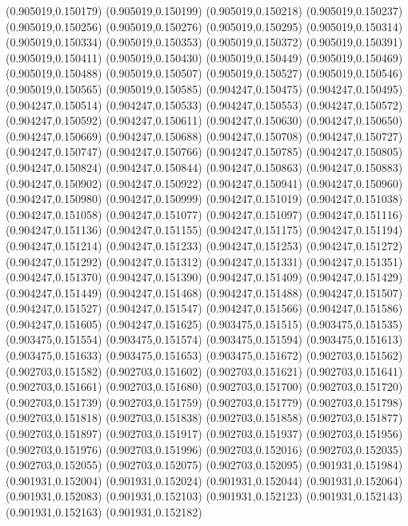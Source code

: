 (0.905019,0.150179)
(0.905019,0.150199)
(0.905019,0.150218)
(0.905019,0.150237)
(0.905019,0.150256)
(0.905019,0.150276)
(0.905019,0.150295)
(0.905019,0.150314)
(0.905019,0.150334)
(0.905019,0.150353)
(0.905019,0.150372)
(0.905019,0.150391)
(0.905019,0.150411)
(0.905019,0.150430)
(0.905019,0.150449)
(0.905019,0.150469)
(0.905019,0.150488)
(0.905019,0.150507)
(0.905019,0.150527)
(0.905019,0.150546)
(0.905019,0.150565)
(0.905019,0.150585)
(0.904247,0.150475)
(0.904247,0.150495)
(0.904247,0.150514)
(0.904247,0.150533)
(0.904247,0.150553)
(0.904247,0.150572)
(0.904247,0.150592)
(0.904247,0.150611)
(0.904247,0.150630)
(0.904247,0.150650)
(0.904247,0.150669)
(0.904247,0.150688)
(0.904247,0.150708)
(0.904247,0.150727)
(0.904247,0.150747)
(0.904247,0.150766)
(0.904247,0.150785)
(0.904247,0.150805)
(0.904247,0.150824)
(0.904247,0.150844)
(0.904247,0.150863)
(0.904247,0.150883)
(0.904247,0.150902)
(0.904247,0.150922)
(0.904247,0.150941)
(0.904247,0.150960)
(0.904247,0.150980)
(0.904247,0.150999)
(0.904247,0.151019)
(0.904247,0.151038)
(0.904247,0.151058)
(0.904247,0.151077)
(0.904247,0.151097)
(0.904247,0.151116)
(0.904247,0.151136)
(0.904247,0.151155)
(0.904247,0.151175)
(0.904247,0.151194)
(0.904247,0.151214)
(0.904247,0.151233)
(0.904247,0.151253)
(0.904247,0.151272)
(0.904247,0.151292)
(0.904247,0.151312)
(0.904247,0.151331)
(0.904247,0.151351)
(0.904247,0.151370)
(0.904247,0.151390)
(0.904247,0.151409)
(0.904247,0.151429)
(0.904247,0.151449)
(0.904247,0.151468)
(0.904247,0.151488)
(0.904247,0.151507)
(0.904247,0.151527)
(0.904247,0.151547)
(0.904247,0.151566)
(0.904247,0.151586)
(0.904247,0.151605)
(0.904247,0.151625)
(0.903475,0.151515)
(0.903475,0.151535)
(0.903475,0.151554)
(0.903475,0.151574)
(0.903475,0.151594)
(0.903475,0.151613)
(0.903475,0.151633)
(0.903475,0.151653)
(0.903475,0.151672)
(0.902703,0.151562)
(0.902703,0.151582)
(0.902703,0.151602)
(0.902703,0.151621)
(0.902703,0.151641)
(0.902703,0.151661)
(0.902703,0.151680)
(0.902703,0.151700)
(0.902703,0.151720)
(0.902703,0.151739)
(0.902703,0.151759)
(0.902703,0.151779)
(0.902703,0.151798)
(0.902703,0.151818)
(0.902703,0.151838)
(0.902703,0.151858)
(0.902703,0.151877)
(0.902703,0.151897)
(0.902703,0.151917)
(0.902703,0.151937)
(0.902703,0.151956)
(0.902703,0.151976)
(0.902703,0.151996)
(0.902703,0.152016)
(0.902703,0.152035)
(0.902703,0.152055)
(0.902703,0.152075)
(0.902703,0.152095)
(0.901931,0.151984)
(0.901931,0.152004)
(0.901931,0.152024)
(0.901931,0.152044)
(0.901931,0.152064)
(0.901931,0.152083)
(0.901931,0.152103)
(0.901931,0.152123)
(0.901931,0.152143)
(0.901931,0.152163)
(0.901931,0.152182)
